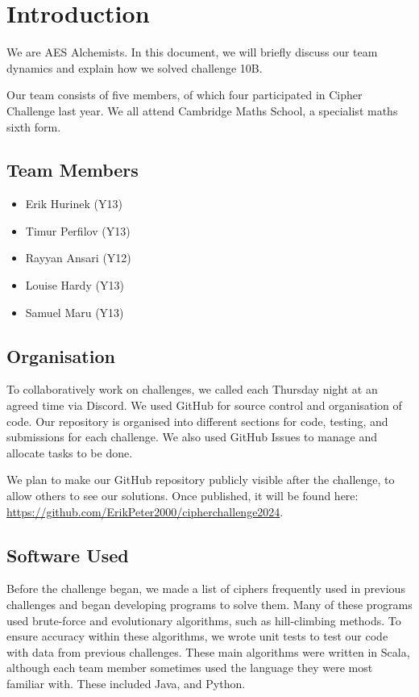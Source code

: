 
\section*{Introduction}

We are AES Alchemists. In this document, we will briefly discuss our team dynamics and explain how we solved challenge 10B.

Our team consists of five members, of which four participated in Cipher Challenge last year. We all attend Cambridge Maths School, a specialist maths sixth form.

\subsection*{Team Members}

\begin{itemize}
    \item Erik Hurinek (Y13)
    \item Timur Perfilov (Y13)
    \item Rayyan Ansari (Y12)
    \item Louise Hardy (Y13)
    \item Samuel Maru (Y13)
\end{itemize}

\subsection*{Organisation}

To collaboratively work on challenges, we called each Thursday night at an agreed time via Discord. We used GitHub for source control and organisation of code. Our repository is organised into different sections for code, testing, and submissions for each challenge. We also used GitHub Issues to manage and allocate tasks to be done.

We plan to make our GitHub repository publicly visible after the challenge, to allow others to see our solutions. Once published, it will be found here: \url{https://github.com/ErikPeter2000/cipherchallenge2024}.

\subsection*{Software Used}

Before the challenge began, we made a list of ciphers frequently used in previous challenges and began developing programs to solve them. Many of these programs used brute-force and evolutionary algorithms, such as hill-climbing methods. To ensure accuracy within these algorithms, we wrote unit tests to test our code with data from previous challenges. These main algorithms were written in Scala, although each team member sometimes used the language they were most familiar with. These included Java, and Python.